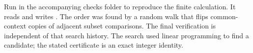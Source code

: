 \documentclass[11pt]{article}
\theoremstyle{remark}\newtheorem{remark}[theorem]{Remark}
\begin{document}
Run  in the accompanying checks folder to
reproduce the finite calculation. It reads  and
writes .
The order was found by a random walk that flips common-context copies of
adjacent subset comparisons. The final verification is independent of that
search history. The search used linear programming to find a candidate;
the stated certificate is an exact integer identity.
\end{document}
